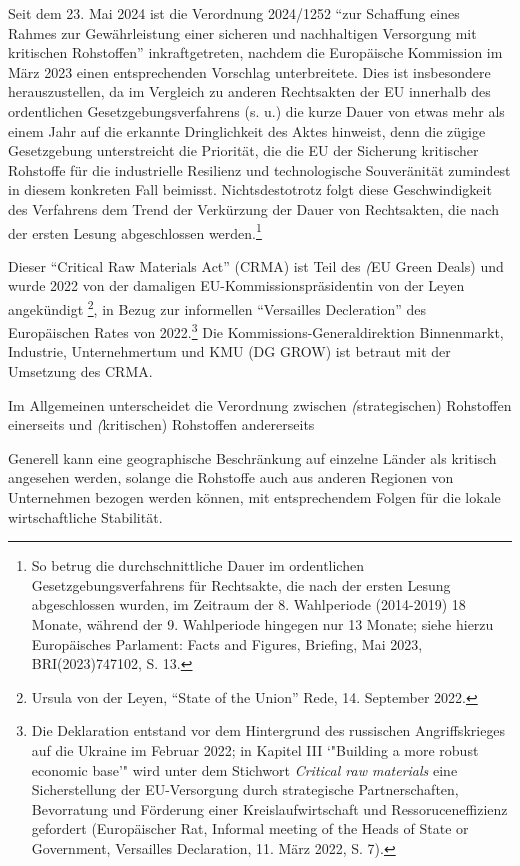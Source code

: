 \documentclass[12pt,a4paper,oneside]{book} %
\begin{document}
	Seit dem 23. Mai 2024 ist die Verordnung 2024/1252 "`zur Schaffung eines Rahmes zur Gewährleistung einer sicheren und nachhaltigen Versorgung mit kritischen Rohstoffen"' inkraftgetreten, nachdem die Europäische Kommission im März 2023 einen entsprechenden Vorschlag unterbreitete. Dies ist insbesondere herauszustellen, da im Vergleich zu anderen Rechtsakten der EU innerhalb des ordentlichen Gesetzgebungsverfahrens (s. u.) die kurze Dauer von etwas mehr als einem Jahr auf die erkannte Dringlichkeit des Aktes hinweist, denn die zügige Gesetzgebung unterstreicht die Priorität, die die EU der Sicherung kritischer Rohstoffe für die industrielle Resilienz und technologische Souveränität zumindest in diesem konkreten Fall beimisst. Nichtsdestotrotz folgt diese Geschwindigkeit des Verfahrens dem Trend der Verkürzung der Dauer von Rechtsakten, die nach der ersten Lesung abgeschlossen werden.\footnote{So betrug die durchschnittliche Dauer im ordentlichen Gesetzgebungsverfahrens für Rechtsakte, die nach der ersten Lesung abgeschlossen wurden, im Zeitraum der 8. Wahlperiode (2014-2019) 18 Monate, während der 9. Wahlperiode hingegen nur 13 Monate; siehe hierzu Europäisches Parlament: Facts and Figures, Briefing, Mai 2023, BRI(2023)747102, S. 13.} 
	
	
	Dieser "`Critical Raw Materials Act"' (CRMA) ist Teil des \textit(EU Green Deals) und wurde 2022 von der damaligen EU-Kommissionspräsidentin von der Leyen angekündigt \footnote{Ursula von der Leyen, "`State of the Union"' Rede, 14. September 2022.}, in Bezug zur informellen "`Versailles Decleration"' des Europäischen Rates von 2022.\footnote{Die Deklaration entstand vor dem Hintergrund des russischen Angriffskrieges auf die Ukraine im Februar 2022; in Kapitel III `"Building a more robust economic base'" wird unter dem Stichwort \textit{Critical raw materials} eine Sicherstellung der EU-Versorgung durch strategische Partnerschaften, Bevorratung und Förderung einer Kreislaufwirtschaft und Ressoruceneffizienz gefordert (Europäischer Rat, Informal meeting of the Heads of State or Government, Versailles Declaration, 11. März 2022, S. 7).} Die Kommissions-Generaldirektion Binnenmarkt, Industrie, Unternehmertum und KMU (DG GROW) ist betraut mit der Umsetzung des CRMA.
	
	Im Allgemeinen unterscheidet die Verordnung zwischen \textit(strategischen) Rohstoffen einerseits und \textit(kritischen) Rohstoffen andererseits
	
	Generell kann eine geographische Beschränkung auf einzelne Länder als kritisch angesehen werden, solange die Rohstoffe auch aus anderen Regionen von Unternehmen bezogen werden können, mit entsprechendem Folgen für die lokale wirtschaftliche Stabilität.\autocite[s. hierzu]{ruettinger_doddfrank_2015}
	
\end{document}

